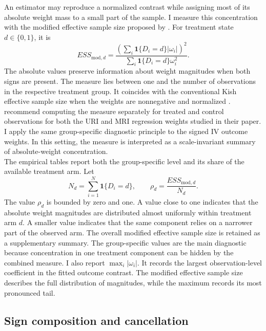 \documentclass[12pt, a4paper, oneside]{article}
\theoremstyle{plain}
\theoremstyle{definition}
\begin{document}
An estimator may reproduce a normalized contrast while assigning most of its absolute
weight mass to a small part of the sample. I measure this concentration with the
modified effective sample size proposed by
\citet[Section~5.4]{chattopadhyay2023implied}. For treatment state
\(d\in\{0,1\}\), it is
\begin{equation}
    ESS_{\mathrm{mod},d}
    =
    \frac{
      \left(\sum_i\mathbf 1\{D_i=d\}|\omega_i|\right)^2
    }{
      \sum_i\mathbf 1\{D_i=d\}\omega_i^2
    }.
    \label{eq:ess_modified_group}
\end{equation}
The absolute values preserve information about weight magnitudes when both signs are
present. The measure lies between one and the number of observations in the respective
treatment group. It coincides with the conventional Kish effective sample size when
the weights are nonnegative and normalized \citep{kish1965survey}.\\
\citet[Section~5.4]{chattopadhyay2023implied} recommend computing the measure
separately for treated and control observations for both the URI and MRI regression
weights studied in their paper. I apply the same group-specific diagnostic principle
to the signed IV outcome weights. In this setting, the measure is interpreted as a
scale-invariant summary of absolute-weight concentration. \\
The empirical tables report both the group-specific level and its share of the
available treatment arm. Let
\begin{equation}
    N_d=\sum_{i=1}^{N}\mathbf 1\{D_i=d\},
    \qquad
    \rho_d=\frac{ESS_{\mathrm{mod},d}}{N_d}.
    \label{eq:ess_retention}
\end{equation}
The value \(\rho_d\) is bounded by zero and one. A value close to one indicates that
the absolute weight magnitudes are distributed almost uniformly within treatment arm
\(d\). A smaller value indicates that the same component relies on a narrower part of
the observed arm. 
The overall modified effective sample size is retained as a supplementary summary.
The group-specific values are the main diagnostic because concentration in one
treatment component can be hidden by the combined measure. I also report
\(\max_i|\omega_i|\). It records the largest observation-level coefficient in the
fitted outcome contrast. The modified effective sample size describes the full
distribution of magnitudes, while the maximum records its most pronounced tail.

\subsection{Sign composition and cancellation}
\label{subsec:weight_cancellation}
\end{document}
